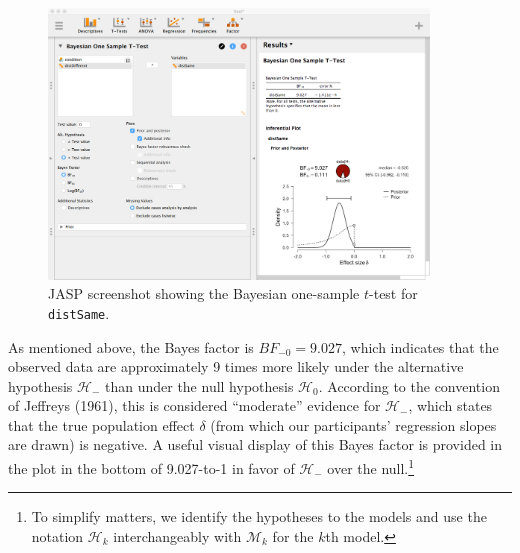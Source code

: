 \documentclass[english,,doc,floatsintext]{apa6}
\let\rmarkdownfootnote\footnote%
\def\footnote{\protect\rmarkdownfootnote}
\begin{document}
\begin{figure}[htbp]
\centering
\includegraphics[width=0.9\textwidth,height=\textheight]{figures/ttestBayes.png}
\caption{\label{fig:ttestBayes}JASP screenshot showing the Bayesian one-sample \(t\)-test for \texttt{distSame}.}
\end{figure}

As mentioned above, the Bayes factor is \(BF_{-0}=9.027\), which indicates that the observed data are approximately 9 times more likely under the alternative hypothesis \(\mathcal{H}_{-}\) than under the null hypothesis \(\mathcal{H}_{0}\). According to the convention of Jeffreys (1961), this is considered \enquote{moderate} evidence for \(\mathcal{H}_{-}\), which states that the true population effect \(\delta\) (from which our participants' regression slopes are drawn) is negative. A useful visual display of this Bayes factor is provided in the plot in the bottom of 9.027-to-1 in favor of \(\mathcal{H}_{-}\) over the null.\footnote{To simplify matters, we identify the hypotheses to the models and use the notation \(\mathcal{H}_{k}\) interchangeably with \(\mathcal{M}_{k}\) for the \(k\)th model.}
\end{document}
